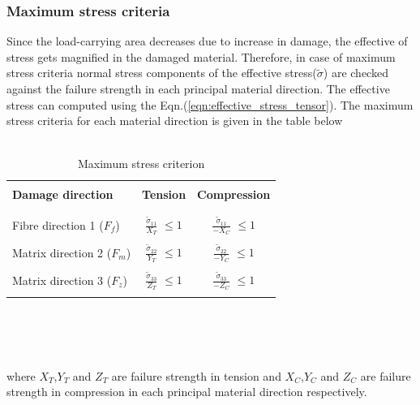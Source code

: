 \documentclass[a4paper,12pt]{extarticle}
\begin{document}
\subsubsection{Maximum stress criteria}
\indent\indent\indent Since the load-carrying area decreases due to increase in damage, the effective of stress gets magnified in the damaged material. Therefore, in case of maximum stress criteria normal stress components of the effective stress($\tilde{\sigma}$) are checked against the failure strength in each principal material direction. The effective stress can computed using the Eqn.(\ref{eqn:effective_stress_tensor}). The maximum stress criteria for each material direction is given in the table below
\\
\\
\begin{table}[h!]
  \begin{center}
     \begin{tabular}{l  c  c} 
     \hline
     \\
      \textbf{Damage direction} \;\;& \textbf{Tension} \;& \textbf{Compression}\\
      \\
      \hline
      \\
      Fibre direction 1 ($F_{f}$) & \Large{$\frac{\tilde{\sigma}_{11}}{X_{T}} $}\small{ $\leq 1$} & \Large{$\frac{\tilde{\sigma}_{11}}{-X_{C}} $}\small{ $\leq 1$} \\
      \\
      Matrix direction 2 ($F_{m}$)  &  \Large{$\frac{\tilde{\sigma}_{22}}{Y_{T}} $}\small{ $\leq 1$}  & \Large{$\frac{\tilde{\sigma}_{22}}{-Y_{C}} $}\small{ $\leq 1$}\\
      \\
      Matrix direction 3 ($F_{z}$) &  \Large{$\frac{\tilde{\sigma}_{33}}{Z_{T}} $}\small{ $\leq 1$}  &   \Large{$\frac{\tilde{\sigma}_{33}}{-Z_{C}} $}\small{ $\leq 1$}\\
       \\
       \hline
    \end{tabular}
    \\
    \caption{Maximum stress criterion}
    \label{tab:Maximum stress criterion}
  \end{center}
\end{table}\\
\\
where $X_{T}$,$ Y_{T} $ and $Z_{T}$ are failure strength in tension and $X_{C}$,$ Y_{C} $ and $Z_{C}$ are failure strength in compression in each principal material direction respectively.\\
\\
\end{document}
